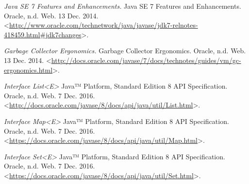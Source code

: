 \begin{thebibliography}{9}

\textit{Java SE 7 Features and Enhancements.} Java SE 7 Features and Enhancements. Oracle, n.d. Web. 13 Dec. 2014. <\url{http://www.oracle.com/technetwork/java/javase/jdk7-relnotes-418459.html#jdk7changes}>.


\textit{Garbage Collector Ergonomics.} Garbage Collector Ergonomics. Oracle, n.d. Web. 13 Dec. 2014. <\url{http://docs.oracle.com/javase/7/docs/technotes/guides/vm/gc-ergonomics.html}>.


\textit{Interface List<E>} Java™ Platform, Standard Edition 8
API Specification. Oracle, n.d. Web. 7 Dec. 2016. <\url{http://docs.oracle.com/javase/8/docs/api/java/util/List.html}>.


\textit{Interface Map<E>} Java™ Platform, Standard Edition 8
API Specification. Oracle, n.d. Web. 7 Dec. 2016. <\url{https://docs.oracle.com/javase/8/docs/api/java/util/Map.html}>.


\textit{Interface Set<E>} Java™ Platform, Standard Edition 8
API Specification. Oracle, n.d. Web. 7 Dec. 2016. <\url{https://docs.oracle.com/javase/8/docs/api/java/util/Set.html}>.



\end{thebibliography}